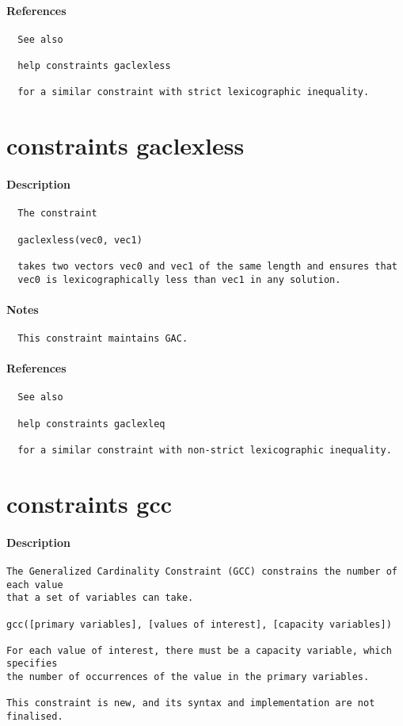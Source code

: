 \paragraph{References}
{\footnotesize
\begin{verbatim}
  See also

  help constraints gaclexless

  for a similar constraint with strict lexicographic inequality.
\end{verbatim}
}
\section{constraints gaclexless}
\paragraph{Description}
{\footnotesize
\begin{verbatim}
  The constraint

  gaclexless(vec0, vec1)

  takes two vectors vec0 and vec1 of the same length and ensures that
  vec0 is lexicographically less than vec1 in any solution.
\end{verbatim}
}
\paragraph{Notes}
{\footnotesize
\begin{verbatim}
  This constraint maintains GAC.
\end{verbatim}
}
\paragraph{References}
{\footnotesize
\begin{verbatim}
  See also

  help constraints gaclexleq

  for a similar constraint with non-strict lexicographic inequality.
\end{verbatim}
}
\section{constraints gcc}
\paragraph{Description}
{\footnotesize
\begin{verbatim}
The Generalized Cardinality Constraint (GCC) constrains the number of each value
that a set of variables can take.

gcc([primary variables], [values of interest], [capacity variables])

For each value of interest, there must be a capacity variable, which specifies
the number of occurrences of the value in the primary variables.

This constraint is new, and its syntax and implementation are not finalised.
\end{verbatim}
}
